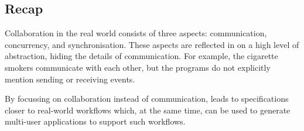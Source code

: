\subsection{Recap}

Collaboration in the real world consists of three aspects: communication, concurrency, and synchronisation.
These aspects are reflected in \TOP on a high level of abstraction, hiding the details of communication.
For example, the cigarette smokers communicate with each other, but the programs do not explicitly mention sending or receiving events.

By focussing on collaboration instead of communication, \TOP leads to specifications closer to real-world workflows which, at the same time, can be used to generate multi-user applications to support such workflows.
